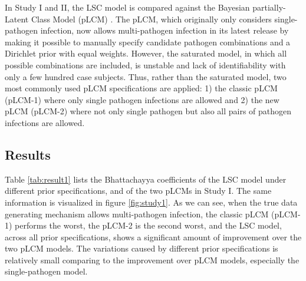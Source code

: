 \documentclass[11 pt, a4paper]{article}  %
\begin{document}
In Study I and II, the LSC model is compared against the Bayesian partially-Latent Class Model (pLCM) \cite{wu2015partially}. The pLCM, which originally only considers single-pathogen infection, now allows multi-pathogen infection in its latest release by making it possible to manually specify candidate pathogen combinations and a Dirichlet prior with equal weights. However, the saturated model, in which all possible combinations are included, is unstable and lack of identifiability with only a few hundred case subjects. Thus, rather than the saturated model, two most commonly used pLCM specifications are applied: 1) the classic pLCM (pLCM-1) where only single pathogen infections are allowed and 2) the new pLCM (pLCM-2) where not only single pathogen but also all pairs of pathogen infections are allowed.\\

\subsection{Results}
Table \ref{tab:result1} lists the Bhattachayya coefficients of the LSC model under different prior specifications, and of the two pLCMs in Study I. The same information is visualized in figure \ref{fig:study1}. As we can see, when the true data generating mechanism allows multi-pathogen infection, the classic pLCM (pLCM-1) performs the worst, the pLCM-2 is the second worst, and the LSC model, across all prior specifications, shows a significant amount of improvement over the two pLCM models. The variations caused by different prior specifications is relatively small comparing to the improvement over pLCM models, especially the single-pathogen model.\\
\end{document}
